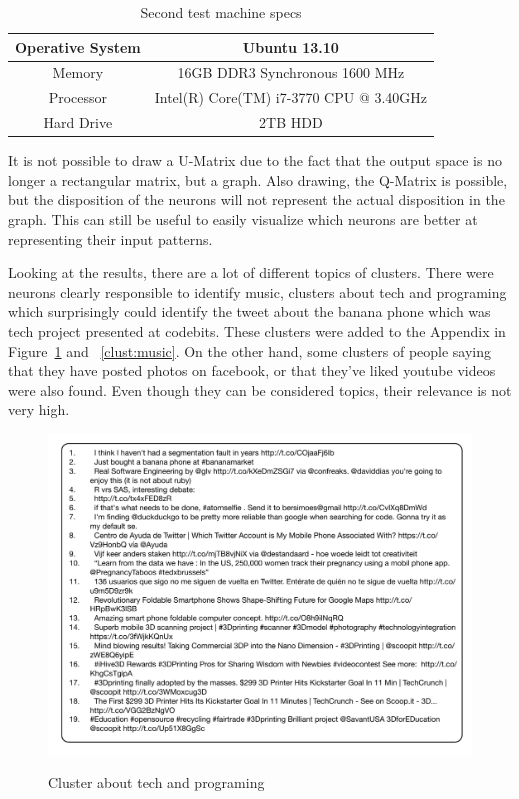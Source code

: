 \documentclass[journal]{IEEEtran}
\begin{document}
\begin{table}[H]
  \caption{Second test machine specs}
  \label{tab:acer_test}
  \begin{center}
    \begin{tabular}{|c|c|}
      \hline
      Operative System & Ubuntu 13.10\\
      \hline
      Memory           & 16GB DDR3 Synchronous 1600 MHz      \\
      \hline
      Processor        & Intel(R) Core(TM) i7-3770 CPU @ 3.40GHz \\
      \hline
      Hard Drive       & 2TB HDD  \\
      \hline
    \end{tabular}
  \end{center}
\end{table}


It is not possible to draw a \ac{U-Matrix} due to the fact that the output space is no longer a rectangular matrix, but a graph. Also drawing, the \ac{Q-Matrix} is possible, but the disposition of the neurons will not represent the actual disposition in the graph. This can still be useful to easily visualize which neurons are better at representing their input patterns. 

Looking at the results, there are a lot of different topics of clusters. There were neurons clearly responsible to identify music, clusters about tech and programing which surprisingly could identify the tweet about the banana phone which was tech project presented at codebits. These clusters were added to the Appendix in Figure~\ref{clust:tech} and ~\ref{clust:music}.
On the other hand, some clusters of people saying that they have posted photos on facebook, or that they've liked youtube videos were also found. Even though they can be considered topics, their relevance is not very high.

\begin{figure}[h]
  \centering
  \includegraphics[width=0.8\linewidth]{./images/1clustertech.pdf}
  \label{clust:tech}
  \caption{Cluster about tech and programing}
\end{figure}
\end{document}
